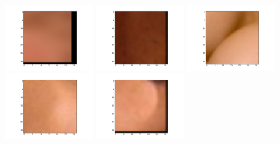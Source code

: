 \documentclass{report}
\begin{document}
\noindent
\includegraphics[width=4cm]{dbshow-1-0.png} 
\includegraphics[width=4cm]{dbshow-1-1.png} 
\includegraphics[width=4cm]{dbshow-1-2.png} 
\includegraphics[width=4cm]{dbshow-1-3.png} 
\includegraphics[width=4cm]{dbshow-1-4.png} 
\end{document}

